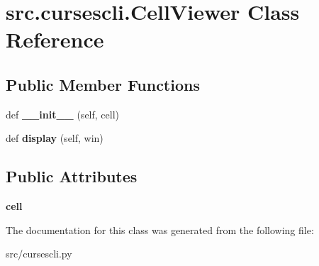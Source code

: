 \hypertarget{classsrc_1_1cursescli_1_1_cell_viewer}{}\section{src.\+cursescli.\+Cell\+Viewer Class Reference}
\label{classsrc_1_1cursescli_1_1_cell_viewer}
\subsection*{Public Member Functions}
\begin{DoxyCompactItemize}
\item 
\hypertarget{classsrc_1_1cursescli_1_1_cell_viewer_a519420c2af84c8789fbcd94a1acb728a}{}\label{classsrc_1_1cursescli_1_1_cell_viewer_a519420c2af84c8789fbcd94a1acb728a} 
def {\bfseries \+\_\+\+\_\+init\+\_\+\+\_\+} (self, cell)
\item 
\hypertarget{classsrc_1_1cursescli_1_1_cell_viewer_a39d39cf9fe9fc5878429d882bac5ef2c}{}\label{classsrc_1_1cursescli_1_1_cell_viewer_a39d39cf9fe9fc5878429d882bac5ef2c} 
def {\bfseries display} (self, win)
\end{DoxyCompactItemize}
\subsection*{Public Attributes}
\begin{DoxyCompactItemize}
\item 
\hypertarget{classsrc_1_1cursescli_1_1_cell_viewer_a47f284676212a8292fcf5ae5ca6f840d}{}\label{classsrc_1_1cursescli_1_1_cell_viewer_a47f284676212a8292fcf5ae5ca6f840d} 
{\bfseries cell}
\end{DoxyCompactItemize}


The documentation for this class was generated from the following file\+:\begin{DoxyCompactItemize}
\item 
src/cursescli.\+py\end{DoxyCompactItemize}
